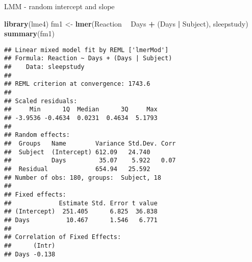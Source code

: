 \documentclass[ignorenonframetext,]{beamer}
\newenvironment{Shaded}{\begin{snugshade}}{\end{snugshade}}
\newcommand{\KeywordTok}[1]{\textcolor[rgb]{0.13,0.29,0.53}{\textbf{#1}}}
\newcommand{\StringTok}[1]{\textcolor[rgb]{0.31,0.60,0.02}{#1}}
\newcommand{\OperatorTok}[1]{\textcolor[rgb]{0.81,0.36,0.00}{\textbf{#1}}}
\newcommand{\NormalTok}[1]{#1}
\begin{document}
\begin{frame}[fragile]

\begin{block}{LMM - random intercept and slope}

\begin{Shaded}
\begin{Highlighting}[]
\KeywordTok{library}\NormalTok{(lme4)}
\NormalTok{fm1 <-}\StringTok{ }\KeywordTok{lmer}\NormalTok{(Reaction }\OperatorTok{~}\StringTok{ }\NormalTok{Days }\OperatorTok{+}\StringTok{ }\NormalTok{(Days }\OperatorTok{|}\StringTok{ }\NormalTok{Subject), sleepstudy)}
\KeywordTok{summary}\NormalTok{(fm1)}
\end{Highlighting}
\end{Shaded}

\begin{verbatim}
## Linear mixed model fit by REML ['lmerMod']
## Formula: Reaction ~ Days + (Days | Subject)
##    Data: sleepstudy
## 
## REML criterion at convergence: 1743.6
## 
## Scaled residuals: 
##     Min      1Q  Median      3Q     Max 
## -3.9536 -0.4634  0.0231  0.4634  5.1793 
## 
## Random effects:
##  Groups   Name        Variance Std.Dev. Corr
##  Subject  (Intercept) 612.09   24.740       
##           Days         35.07    5.922   0.07
##  Residual             654.94   25.592       
## Number of obs: 180, groups:  Subject, 18
## 
## Fixed effects:
##             Estimate Std. Error t value
## (Intercept)  251.405      6.825  36.838
## Days          10.467      1.546   6.771
## 
## Correlation of Fixed Effects:
##      (Intr)
## Days -0.138
\end{verbatim}

\end{block}

\end{frame}
\end{document}
